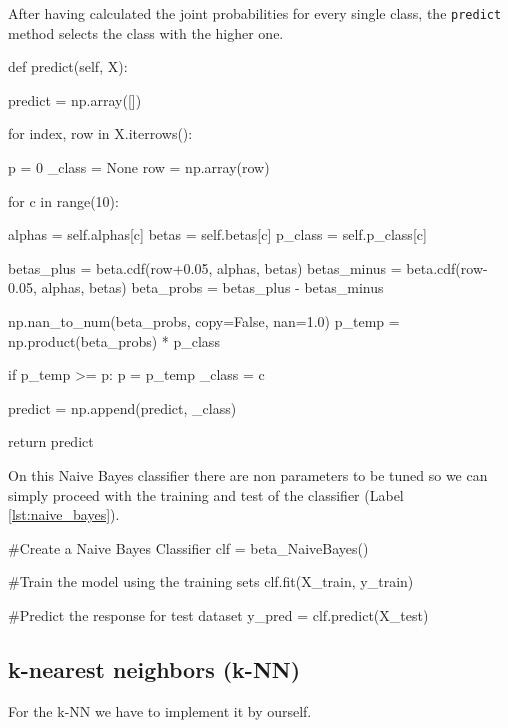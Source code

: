 \documentclass[12pt]{article}
\begin{document}
After having calculated the joint probabilities for every single class, the 
\verb|predict| method selects the class with the higher one.

\begin{python}[caption={Naive Bayes fit method},label={lst:predict_naive}]
def predict(self, X):

    predict = np.array([])

    for index, row in X.iterrows():

        p = 0
        _class = None
        row = np.array(row)

        for c in range(10):

            alphas = self.alphas[c]
            betas = self.betas[c]
            p_class = self.p_class[c]
            
            betas_plus = beta.cdf(row+0.05, alphas, betas)
            betas_minus = beta.cdf(row-0.05, alphas, betas)
            beta_probs = betas_plus - betas_minus
            
            np.nan_to_num(beta_probs, copy=False, nan=1.0)
            p_temp = np.product(beta_probs) * p_class
            

            if p_temp >= p:
                p = p_temp
                _class = c
        
        predict = np.append(predict, _class)
    
    return predict
\end{python}

On this Naive Bayes classifier there are non parameters to be tuned so we can simply
proceed with the training and test of the classifier (Label \ref{lst:naive_bayes}).

\begin{python}[caption={Naive Bayes classifier},label={lst:naive_bayes}]
    #Create a Naive Bayes Classifier
    clf = beta_NaiveBayes() 

    #Train the model using the training sets
    clf.fit(X_train, y_train)
    
    #Predict the response for test dataset
    y_pred = clf.predict(X_test)
\end{python}

\subsection{k-nearest neighbors (k-NN)}

For the k-NN we have to implement it by ourself. 
\end{document}
